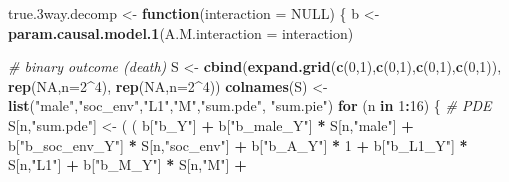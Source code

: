 \documentclass[
]{book}
\newenvironment{Shaded}{\begin{snugshade}}{\end{snugshade}}
\newcommand{\AttributeTok}[1]{\textcolor[rgb]{0.13,0.29,0.53}{#1}}
\newcommand{\CommentTok}[1]{\textcolor[rgb]{0.56,0.35,0.01}{\textit{#1}}}
\newcommand{\ConstantTok}[1]{\textcolor[rgb]{0.56,0.35,0.01}{#1}}
\newcommand{\ControlFlowTok}[1]{\textcolor[rgb]{0.13,0.29,0.53}{\textbf{#1}}}
\newcommand{\DecValTok}[1]{\textcolor[rgb]{0.00,0.00,0.81}{#1}}
\newcommand{\FloatTok}[1]{\textcolor[rgb]{0.00,0.00,0.81}{#1}}
\newcommand{\FunctionTok}[1]{\textcolor[rgb]{0.13,0.29,0.53}{\textbf{#1}}}
\newcommand{\NormalTok}[1]{#1}
\newcommand{\OtherTok}[1]{\textcolor[rgb]{0.56,0.35,0.01}{#1}}
\newcommand{\SpecialCharTok}[1]{\textcolor[rgb]{0.81,0.36,0.00}{\textbf{#1}}}
\newcommand{\StringTok}[1]{\textcolor[rgb]{0.31,0.60,0.02}{#1}}
\begin{document}
\begin{Shaded}
\begin{Highlighting}[]
\NormalTok{true}\FloatTok{.3}\NormalTok{way.decomp }\OtherTok{\textless{}{-}} \ControlFlowTok{function}\NormalTok{(}\AttributeTok{interaction =} \ConstantTok{NULL}\NormalTok{) \{}
\NormalTok{  b }\OtherTok{\textless{}{-}} \FunctionTok{param.causal.model.1}\NormalTok{(}\AttributeTok{A.M.interaction =}\NormalTok{ interaction)}
  
  \CommentTok{\# binary outcome (death)}
\NormalTok{  S }\OtherTok{\textless{}{-}} \FunctionTok{cbind}\NormalTok{(}\FunctionTok{expand.grid}\NormalTok{(}\FunctionTok{c}\NormalTok{(}\DecValTok{0}\NormalTok{,}\DecValTok{1}\NormalTok{),}\FunctionTok{c}\NormalTok{(}\DecValTok{0}\NormalTok{,}\DecValTok{1}\NormalTok{),}\FunctionTok{c}\NormalTok{(}\DecValTok{0}\NormalTok{,}\DecValTok{1}\NormalTok{),}\FunctionTok{c}\NormalTok{(}\DecValTok{0}\NormalTok{,}\DecValTok{1}\NormalTok{)), }\FunctionTok{rep}\NormalTok{(}\ConstantTok{NA}\NormalTok{,}\AttributeTok{n=}\DecValTok{2}\SpecialCharTok{\^{}}\DecValTok{4}\NormalTok{), }\FunctionTok{rep}\NormalTok{(}\ConstantTok{NA}\NormalTok{,}\AttributeTok{n=}\DecValTok{2}\SpecialCharTok{\^{}}\DecValTok{4}\NormalTok{))}
  \FunctionTok{colnames}\NormalTok{(S) }\OtherTok{\textless{}{-}} \FunctionTok{list}\NormalTok{(}\StringTok{"male"}\NormalTok{,}\StringTok{"soc\_env"}\NormalTok{,}\StringTok{"L1"}\NormalTok{,}\StringTok{"M"}\NormalTok{,}\StringTok{"sum.pde"}\NormalTok{, }\StringTok{"sum.pie"}\NormalTok{)}
  \ControlFlowTok{for}\NormalTok{ (n }\ControlFlowTok{in} \DecValTok{1}\SpecialCharTok{:}\DecValTok{16}\NormalTok{) \{}
    \CommentTok{\# PDE }
\NormalTok{    S[n,}\StringTok{"sum.pde"}\NormalTok{] }\OtherTok{\textless{}{-}}\NormalTok{ ( ( b[}\StringTok{"b\_Y"}\NormalTok{] }\SpecialCharTok{+} 
\NormalTok{                            b[}\StringTok{"b\_male\_Y"}\NormalTok{] }\SpecialCharTok{*}\NormalTok{ S[n,}\StringTok{"male"}\NormalTok{] }\SpecialCharTok{+} 
\NormalTok{                            b[}\StringTok{"b\_soc\_env\_Y"}\NormalTok{] }\SpecialCharTok{*}\NormalTok{ S[n,}\StringTok{"soc\_env"}\NormalTok{] }\SpecialCharTok{+} 
\NormalTok{                            b[}\StringTok{"b\_A\_Y"}\NormalTok{] }\SpecialCharTok{*} \DecValTok{1} \SpecialCharTok{+} 
\NormalTok{                            b[}\StringTok{"b\_L1\_Y"}\NormalTok{] }\SpecialCharTok{*}\NormalTok{ S[n,}\StringTok{"L1"}\NormalTok{] }\SpecialCharTok{+}
\NormalTok{                            b[}\StringTok{"b\_M\_Y"}\NormalTok{] }\SpecialCharTok{*}\NormalTok{ S[n,}\StringTok{"M"}\NormalTok{] }\SpecialCharTok{+}

\end{Highlighting}
\end{Shaded}
\end{document}
